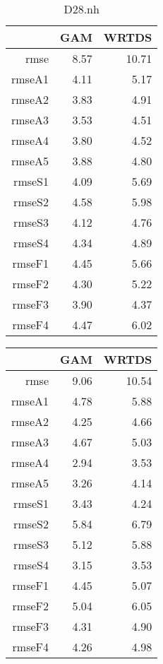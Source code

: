 \documentclass[12pt]{amsart}
\begin{document}
\begin{table}[H]
\centering
\begin{tabular}{rrr}
  \hline
 & GAM & WRTDS \\ 
  \hline
rmse & 8.57 & 10.71 \\ 
  rmseA1 & 4.11 & 5.17 \\ 
  rmseA2 & 3.83 & 4.91 \\ 
  rmseA3 & 3.53 & 4.51 \\ 
  rmseA4 & 3.80 & 4.52 \\ 
  rmseA5 & 3.88 & 4.80 \\ 
  rmseS1 & 4.09 & 5.69 \\ 
  rmseS2 & 4.58 & 5.98 \\ 
  rmseS3 & 4.12 & 4.76 \\ 
  rmseS4 & 4.34 & 4.89 \\ 
  rmseF1 & 4.45 & 5.66 \\ 
  rmseF2 & 4.30 & 5.22 \\ 
  rmseF3 & 3.90 & 4.37 \\ 
  rmseF4 & 4.47 & 6.02 \\ 
   \hline
\end{tabular}
\caption{D28.nh}
\end{table}


\begin{table}[H]
\centering
\begin{tabular}{rrr}
  \hline
 & GAM & WRTDS \\ 
  \hline
rmse & 9.06 & 10.54 \\ 
  rmseA1 & 4.78 & 5.88 \\ 
  rmseA2 & 4.25 & 4.66 \\ 
  rmseA3 & 4.67 & 5.03 \\ 
  rmseA4 & 2.94 & 3.53 \\ 
  rmseA5 & 3.26 & 4.14 \\ 
  rmseS1 & 3.43 & 4.24 \\ 
  rmseS2 & 5.84 & 6.79 \\ 
  rmseS3 & 5.12 & 5.88 \\ 
  rmseS4 & 3.15 & 3.53 \\ 
  rmseF1 & 4.45 & 5.07 \\ 
  rmseF2 & 5.04 & 6.05 \\ 
  rmseF3 & 4.31 & 4.90 \\ 
  rmseF4 & 4.26 & 4.98 \\ 
   \hline
\end{tabular}
\end{table}
\end{document}
